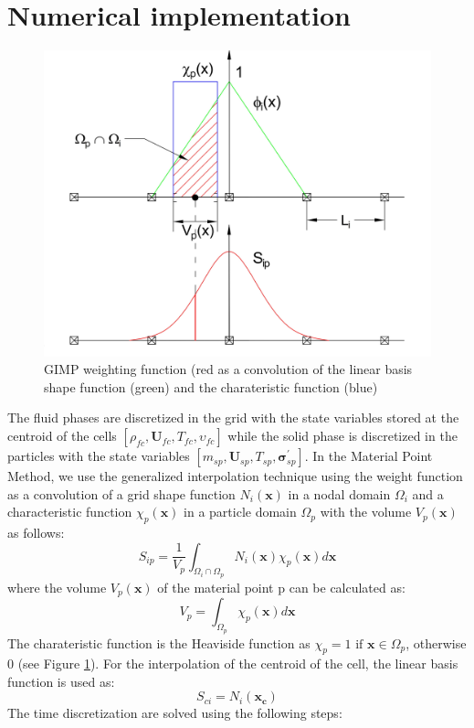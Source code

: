 \documentclass[preprint,12pt]{elsarticle}
\begin{document}
\section{\textsf{Numerical implementation}}
\label{Discretization}
%
%
\begin{figure}[H]
\center
\includegraphics[scale=.5]{GIMPshape.jpg}
\caption{GIMP weighting function (red as a convolution of the linear basis shape function (green) and the charateristic function (blue)}
\label{fig:GIMP}
\end {figure}
%
The fluid phases are discretized in the grid with the state variables stored at the centroid of the cells $[\rho_{fc},\pmb{U}_{fc},T_{fc},\upsilon_{fc}]$ while the solid phase is discretized in the particles with the state variables $[m_{sp},\pmb{U}_{sp},T_{sp},\pmb{\sigma}^\prime_{sp}]$. In the Material Point Method, we use the generalized interpolation technique \cite{GIMP} using the weight function as a convolution of a grid shape function $N_i(\pmb{x})$ in a nodal domain $\Omega_i$ and a characteristic function $\chi_p (\pmb{x})$ in a particle domain $\Omega_p$ with the volume $V_p (\pmb{x})$ as follows:
%
%
\begin{equation}
     S_{ip} = \frac {1}{V_p} \int_{\Omega_i \cap \Omega_p} N_i(\pmb{x}) \chi_p (\pmb{x}) d\pmb{x}
\end {equation}
%
%
where the volume $V_p (\pmb{x})$ of the material point p can be calculated as:
%
%
\begin{equation}
     V_{p} = \int_{\Omega_p} \chi_p (\pmb{x}) d\pmb{x}
\end {equation}
%
The charateristic function is the Heaviside function as $\chi_p = 1  \text{  if  } \pmb{x} \in \Omega_p$, otherwise 0 (see Figure \ref{fig:GIMP}). For the interpolation of the centroid of the cell, the linear basis function is used as:
%
\begin{equation}
     S_{ci}  = N_i(\pmb{x_c}) 
\end {equation}
%
The time discretization are solved using the following steps:
%
%
\end{document}
